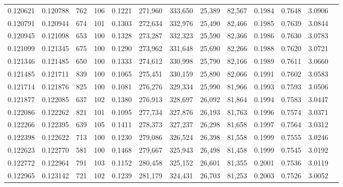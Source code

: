 \begin{tabular}{rrrrrrrrrrrrr}
0.120621 & 0.120788 &   762 & 106 &                                     0.1221 & 271,960 & 333,650 &  25,389 &  82,567 & 0.1984 & 0.7648 & 3.0906 \\
0.120791 & 0.120944 &   674 & 101 &                                     0.1303 & 272,634 & 332,976 &  25,490 &  82,466 & 0.1985 & 0.7639 & 3.0844 \\
0.120945 & 0.121098 &   653 & 100 &                                     0.1328 & 273,287 & 332,323 &  25,590 &  82,366 & 0.1986 & 0.7630 & 3.0783 \\
0.121099 & 0.121345 &   675 & 100 &                                     0.1290 & 273,962 & 331,648 &  25,690 &  82,266 & 0.1988 & 0.7620 & 3.0721 \\
0.121346 & 0.121485 &   650 & 100 &                                     0.1333 & 274,612 & 330,998 &  25,790 &  82,166 & 0.1989 & 0.7611 & 3.0660 \\
0.121485 & 0.121711 &   839 & 100 &                                     0.1065 & 275,451 & 330,159 &  25,890 &  82,066 & 0.1991 & 0.7602 & 3.0583 \\
0.121714 & 0.121876 &   825 & 100 &                                     0.1081 & 276,276 & 329,334 &  25,990 &  81,966 & 0.1993 & 0.7593 & 3.0506 \\
0.121877 & 0.122085 &   637 & 102 &                                     0.1380 & 276,913 & 328,697 &  26,092 &  81,864 & 0.1994 & 0.7583 & 3.0447 \\
0.122086 & 0.122262 &   821 & 101 &                                     0.1095 & 277,734 & 327,876 &  26,193 &  81,763 & 0.1996 & 0.7574 & 3.0371 \\
0.122266 & 0.122395 &   639 & 105 &                                     0.1411 & 278,373 & 327,237 &  26,298 &  81,658 & 0.1997 & 0.7564 & 3.0312 \\
0.122398 & 0.122622 &   713 & 100 &                                     0.1230 & 279,086 & 326,524 &  26,398 &  81,558 & 0.1999 & 0.7555 & 3.0246 \\
0.122623 & 0.122770 &   581 & 100 &                                     0.1468 & 279,667 & 325,943 &  26,498 &  81,458 & 0.1999 & 0.7545 & 3.0192 \\
0.122772 & 0.122964 &   791 & 103 &                                     0.1152 & 280,458 & 325,152 &  26,601 &  81,355 & 0.2001 & 0.7536 & 3.0119 \\
0.122965 & 0.123142 &   721 & 102 &                                     0.1239 & 281,179 & 324,431 &  26,703 &  81,253 & 0.2003 & 0.7526 & 3.0052 \\

\end{tabular}
